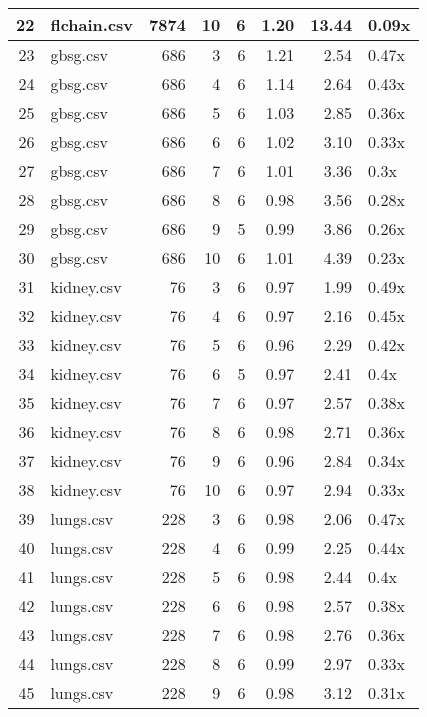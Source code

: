 \begin{table}[ht]
\begin{tabular}{rlrrrrrl}
   \hline
22 & flchain.csv & 7874 &  10 &   6 & 1.20 & 13.44 & 0.09x \\ 
   \hline
23 & gbsg.csv & 686 &   3 &   6 & 1.21 & 2.54 & 0.47x \\ 
   \hline
24 & gbsg.csv & 686 &   4 &   6 & 1.14 & 2.64 & 0.43x \\ 
   \hline
25 & gbsg.csv & 686 &   5 &   6 & 1.03 & 2.85 & 0.36x \\ 
   \hline
26 & gbsg.csv & 686 &   6 &   6 & 1.02 & 3.10 & 0.33x \\ 
   \hline
27 & gbsg.csv & 686 &   7 &   6 & 1.01 & 3.36 & 0.3x \\ 
   \hline
28 & gbsg.csv & 686 &   8 &   6 & 0.98 & 3.56 & 0.28x \\ 
   \hline
29 & gbsg.csv & 686 &   9 &   5 & 0.99 & 3.86 & 0.26x \\ 
   \hline
30 & gbsg.csv & 686 &  10 &   6 & 1.01 & 4.39 & 0.23x \\ 
   \hline
31 & kidney.csv &  76 &   3 &   6 & 0.97 & 1.99 & 0.49x \\ 
   \hline
32 & kidney.csv &  76 &   4 &   6 & 0.97 & 2.16 & 0.45x \\ 
   \hline
33 & kidney.csv &  76 &   5 &   6 & 0.96 & 2.29 & 0.42x \\ 
   \hline
34 & kidney.csv &  76 &   6 &   5 & 0.97 & 2.41 & 0.4x \\ 
   \hline
35 & kidney.csv &  76 &   7 &   6 & 0.97 & 2.57 & 0.38x \\ 
   \hline
36 & kidney.csv &  76 &   8 &   6 & 0.98 & 2.71 & 0.36x \\ 
   \hline
37 & kidney.csv &  76 &   9 &   6 & 0.96 & 2.84 & 0.34x \\ 
   \hline
38 & kidney.csv &  76 &  10 &   6 & 0.97 & 2.94 & 0.33x \\ 
   \hline
39 & lungs.csv & 228 &   3 &   6 & 0.98 & 2.06 & 0.47x \\ 
   \hline
40 & lungs.csv & 228 &   4 &   6 & 0.99 & 2.25 & 0.44x \\ 
   \hline
41 & lungs.csv & 228 &   5 &   6 & 0.98 & 2.44 & 0.4x \\ 
   \hline
42 & lungs.csv & 228 &   6 &   6 & 0.98 & 2.57 & 0.38x \\ 
   \hline
43 & lungs.csv & 228 &   7 &   6 & 0.98 & 2.76 & 0.36x \\ 
   \hline
44 & lungs.csv & 228 &   8 &   6 & 0.99 & 2.97 & 0.33x \\ 
   \hline
45 & lungs.csv & 228 &   9 &   6 & 0.98 & 3.12 & 0.31x \\ 

\end{tabular}
\end{table}
